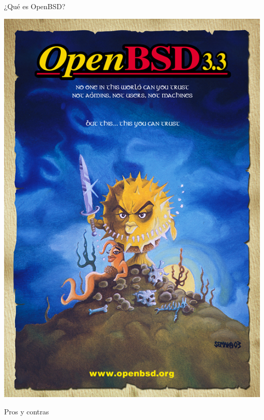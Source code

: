 \documentclass[11pt,spanish]{article}
\newcommand{\rowsp}[1][1em]{\vspace{#1}}
\newcommand{\hone}[1]{{\rowsp[0.3em]\noindent\Large #1 \rowsp[0.3em]}}
\begin{document}
\newpage %

\hone{¿Qué es OpenBSD?}

\begin{center}
\includegraphics[height=0.81\textheight]{img/poster33}
\end{center}

\newpage %

\hone{Pros y contras}
\end{document}

